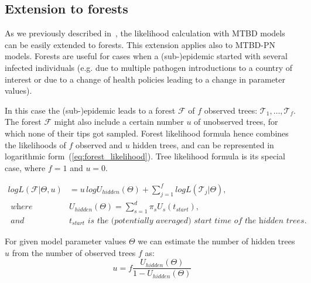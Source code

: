 \documentclass[a4paper,10pt]{article}
\begin{document}
\subsection{Extension to forests}

As we previously described in~\citep{zhukovaFastAccurateMaximumLikelihood2022}, the likelihood calculation with MTBD models can be easily extended to forests. This extension applies also to MTBD-PN models. Forests are useful for cases when a (sub-)epidemic started with several infected individuals (e.g. due to multiple pathogen introductions to a country of interest or due to a change of health policies leading to a change in parameter values).

In this case the (sub-)epidemic leads to a forest $\mathscr{F}$ of $f$ observed trees: $\mathscr{T}_1, \ldots, \mathscr{T}_f$. The forest $\mathscr{F}$ might also include a certain number $u$ of unobserved trees, for which none of their tips got sampled.
Forest likelihood formula hence combines the likelihoods of $f$ observed and $u$ hidden trees, and can be represented in logarithmic form~(\ref{eq:forest_likelihood}). Tree likelihood formula %
is its special case, where $f=1$ and $u=0$. 


\begin{equation}
\begin{split}
logL(\mathscr{F}|\Theta,u)&=u\,logU_{hidden}(\Theta) + \sum\limits_{j=1}^f logL(\mathscr{T}_j|\Theta), \\
\textit{ where }& U_{hidden}(\Theta)=\sum\limits_{s=1}^{d}\pi_s U_s(t_{start}),\\
\textit{ and }& t_{start} \textit{ is the (potentially averaged) start time of the hidden trees.}
\end{split} \label{eq:forest_likelihood} 
\end{equation}

For given model parameter values $\Theta$ we can estimate the number of hidden trees $u$ from the number of observed trees $f$ as:
\begin{equation}
u = f \frac{U_{hidden}(\Theta)}{1 - U_{hidden}(\Theta)}\label{eq:u} 
\end{equation}
\end{document}
